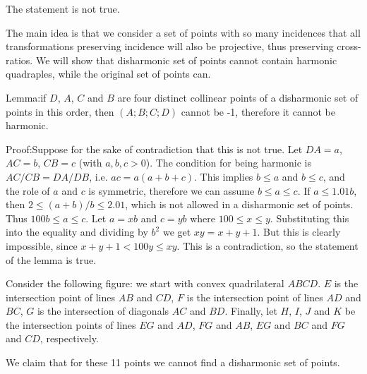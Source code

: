 \documentclass{article}
\begin{document}
The statement is not true.

The main idea is that we consider a set of points with so many incidences that all transformations preserving incidence will also be projective, thus preserving cross-ratios. We will show that disharmonic set of points cannot contain harmonic quadraples, while the original set of points can.

Lemma:if \(\displaystyle D\), \(\displaystyle A\), \(\displaystyle C\) and \(\displaystyle B\) are four distinct collinear points of a disharmonic set of points in this order, then \(\displaystyle (A;B;C;D)\) cannot be -1, therefore it cannot be harmonic.

Proof:Suppose for the sake of contradiction that this is not true. Let \(\displaystyle DA=a\), \(\displaystyle AC=b\), \(\displaystyle CB=c\) (with \(\displaystyle a,b,c>0\)). The condition for being harmonic is \(\displaystyle AC/CB=DA/DB\), i.e. \(\displaystyle ac=a(a+b+c)\). This implies \(\displaystyle b\le a\) and \(\displaystyle b\le c\), and the role of \(\displaystyle a\) and \(\displaystyle c\) is symmetric, therefore we can assume \(\displaystyle b\le a\le c\). If \(\displaystyle a\le 1.01 b\), then \(\displaystyle 2\le (a+b)/b\le 2.01\), which is not allowed in a disharmonic set of points. Thus \(\displaystyle 100b\le a\le c\). Let \(\displaystyle a=xb\) and \(\displaystyle c=yb\) where \(\displaystyle 100\le x\le y\). Substituting this into the equality and dividing by \(\displaystyle b^2\) we get \(\displaystyle xy=x+y+1\). But this is clearly impossible, since \(\displaystyle x+y+1<100y\le xy\). This is a contradiction, so the statement of the lemma is true.

Consider the following figure: we start with convex quadrilateral \(\displaystyle ABCD\). \(\displaystyle E\) is the intersection point of lines \(\displaystyle AB\) and \(\displaystyle CD\), \(\displaystyle F\) is the intersection point of lines \(\displaystyle AD\) and \(\displaystyle BC\), \(\displaystyle G\) is the intersection of diagonals \(\displaystyle AC\) and \(\displaystyle BD\). Finally, let \(\displaystyle H\), \(\displaystyle I\), \(\displaystyle J\) and \(\displaystyle K\) be the intersection points of lines \(\displaystyle EG\) and \(\displaystyle AD\), \(\displaystyle FG\) and \(\displaystyle AB\), \(\displaystyle EG\) and \(\displaystyle BC\) and \(\displaystyle FG\) and \(\displaystyle CD\), respectively.

We claim that for these 11 points we cannot find a disharmonic set of points.
\end{document}
